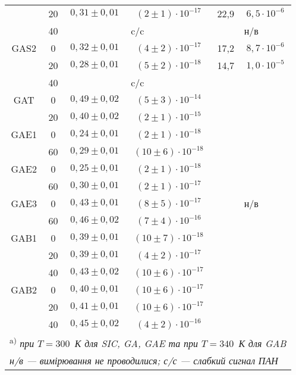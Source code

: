 \documentclass[a4paper,14pt,oneside,openany]{memoir}
\begin{document}
\begin{table}
\begin{tabular}{|c|c|c|c|c|c|}
& 20 & $0,31\pm0,01$ &$(2\pm1)\cdot10^{-17}$&22,9&$6,5\cdot10^{-6}$\\ \cline{2-6}
& 40 & \multicolumn{2}{c|}{c/c}&\multicolumn{2}{c|}{н/в}\\ \hline
GAS2& 0 & $0,32\pm0,01$ &$(4\pm2)\cdot10^{-17}$&17,2&$8,7\cdot10^{-6}$\\ \cline{2-6}
& 20 & $0,28\pm0,01$ &$(5\pm2)\cdot10^{-18}$&14,7&$1,0\cdot10^{-5}$\\ \cline{2-6}
& 40 & \multicolumn{2}{c|}{c/c}&\multicolumn{2}{c|}{}\\ \cline{1-4}
GAT& 0 & $0,49\pm0,02$ &$(5\pm3)\cdot10^{-14}$&\multicolumn{2}{c|}{}\\ \cline{1-4}
& 20 & $0,40\pm0,02$ &$(2\pm1)\cdot10^{-15}$&\multicolumn{2}{c|}{}\\ \cline{1-4}
GAE1& 0 & $0,24\pm0,01$ &$(2\pm1)\cdot10^{-18}$&\multicolumn{2}{c|}{}\\ \cline{1-4}
& 60 & $0,29\pm0,01$ &$(10\pm6)\cdot10^{-18}$&\multicolumn{2}{c|}{}\\ \cline{1-4}
GAE2& 0 & $0,25\pm0,01$ &$(2\pm1)\cdot10^{-18}$&\multicolumn{2}{c|}{}\\ \cline{1-4}
& 60 & $0,30\pm0,01$ &$(2\pm1)\cdot10^{-17}$&\multicolumn{2}{c|}{}\\ \cline{1-4}
GAE3& 0 & $0,43\pm0,01$ &$(8\pm5)\cdot10^{-17}$&\multicolumn{2}{c|}{н/в}\\ \cline{1-4}
& 60 & $0,46\pm0,02$ &$(7\pm4)\cdot10^{-16}$&\multicolumn{2}{c|}{}\\ \cline{1-4}
GAB1& 0 & $0,39\pm0,01$ &$(10\pm7)\cdot10^{-18}$&\multicolumn{2}{c|}{}\\ \cline{1-4}
& 20 & $0,39\pm0,01$ &$(4\pm2)\cdot10^{-17}$&\multicolumn{2}{c|}{}\\ \cline{1-4}
& 40 & $0,43\pm0,02$ &$(10\pm6)\cdot10^{-17}$&\multicolumn{2}{c|}{}\\ \cline{1-4}
GAB2& 0 & $0,40\pm0,01$ &$(10\pm6)\cdot10^{-17}$&\multicolumn{2}{c|}{}\\ \cline{1-4}
& 20 & $0,41\pm0,01$ &$(10\pm6)\cdot10^{-17}$&\multicolumn{2}{c|}{}\\ \cline{1-4}
& 40 & $0,45\pm0,02$ &$(4\pm2)\cdot10^{-16}$&\multicolumn{2}{c|}{}\\  \hline
\multicolumn{6}{l}{\textsuperscript{ a)} \emph{при $T=300$~К для SIC, GA, GAE та при  $T=340$~К для GAB}}\\
\multicolumn{6}{l}{\emph{н/в --- вимірювання не проводилися; с/с --- слабкий сигнал ПАН}}\\
\end{tabular}
\end{table}
\end{document}
